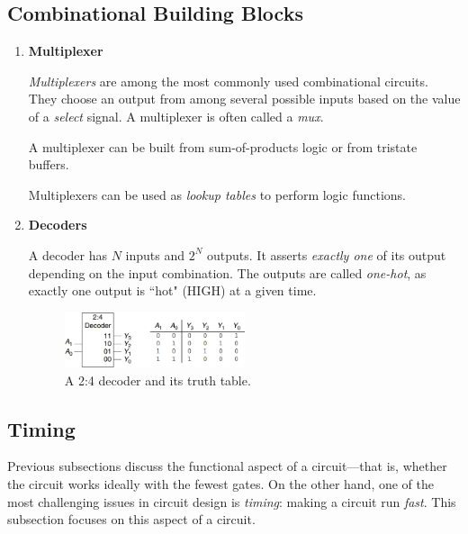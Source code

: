 \documentclass[12pt]{article}
\begin{document}
\subsection{Combinational Building Blocks}

\begin{enumerate}
    \item \textbf{Multiplexer}

    \textit{Multiplexers} are among the most commonly used combinational circuits. They choose an output from among several possible inputs based on the value of a \textit{select} signal. A multiplexer is often called a \textit{mux}.

    A multiplexer can be built from sum-of-products logic or from tristate buffers.

    Multiplexers can be used as \textit{lookup tables} to perform logic functions.

    \item \textbf{Decoders}

    A decoder has $N$ inputs and $2^N$ outputs. It asserts \textit{exactly one} of its output depending on the input combination. The outputs are called \textit{one-hot}, as exactly one output is ``hot" (HIGH) at a given time.

    \begin{figure}[h]
        \centering
        \includegraphics[width=0.5\textwidth]{decoder.png}
        \caption{A 2:4 decoder and its truth table.}
        \label{figure:7}
    \end{figure}
\end{enumerate}

\subsection{Timing}

Previous subsections discuss the functional aspect of a circuit---that is, whether the circuit works ideally with the fewest gates. On the other hand, one of the most challenging issues in circuit design is \textit{timing}: making a circuit run \textit{fast}. This subsection focuses on this aspect of a circuit.
\end{document}

